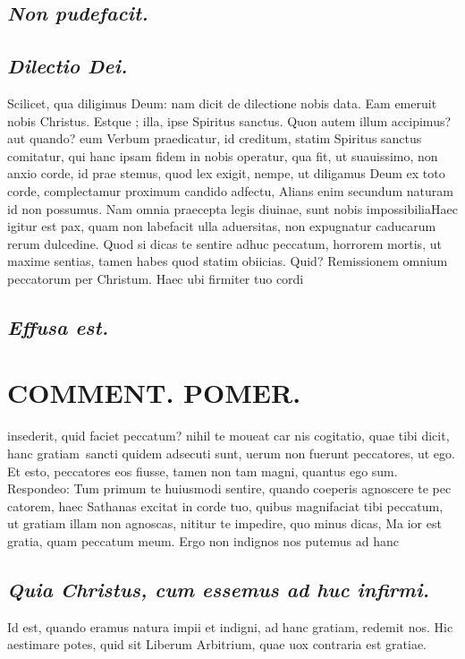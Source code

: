 \documentclass{article}
\begin{document}
\begin{pages}
\subsection*{\textit{Non pudefacit. }}
{}
\subsection*{\textit{Dilectio Dei. }}\pstart Scilicet, qua diligimus Deum: nam dicit de dilectione nobis data.   \pend\pstart Eam emeruit nobis Christus. Estque ; illa, ipse Spiritus sanctus. Quon autem illum accipimus? aut quando? eum Verbum praedicatur, id creditum, statim Spiritus sanctus comitatur, qui hanc ipsam fidem in nobis operatur, qua fit, ut suauissimo, non anxio corde, id prae stemus, quod lex exigit, nempe, ut diligamus Deum ex toto corde, complectamur proximum candido adfectu, Alians enim secundum naturam id non possumus. Nam omnia praecepta legis diuinae, sunt nobis impossibiliaHaec igitur est pax, quam non labefacit ulla aduersitas, non expugnatur caducarum rerum dulcedine. Quod si dicas te sentire adhuc peccatum, horrorem mortis, ut maxime sentias, tamen habes quod statim obiicias. Quid? Remissionem omnium peccatorum per Christum. Haec ubi firmiter tuo cordi\pend
{}
{}
\subsection*{\textit{Effusa est. }}\pstart  \pend
\section*{COMMENT. POMER.  }\pstart insederit, quid faciet peccatum? nihil te moueat car nis cogitatio, quae tibi dicit, hanc gratiam sancti quidem adsecuti sunt, uerum non fuerunt peccatores, ut ego. Et esto, peccatores eos fiusse, tamen non tam magni, quantus ego sum. Respondeo: Tum primum te huiusmodi sentire, quando coeperis agnoscere te pec catorem, haec Sathanas excitat in corde tuo, quibus magnifaciat tibi peccatum, ut gratiam illam non agnoscas, nititur te impedire, quo minus dicas, Ma ior est gratia, quam peccatum meum. Ergo non indignos nos putemus ad hanc\pend
{}
{}
\subsection*{\textit{Quia Christus, cum essemus ad huc infirmi. }}\pstart Id est, quando eramus natura impii et indigni, ad hanc gratiam, redemit nos. Hic aestimare potes, quid sit Liberum Arbitrium, quae uox contraria est gratiae.   \pend
{}
{}

\end{pages}
\end{document}
